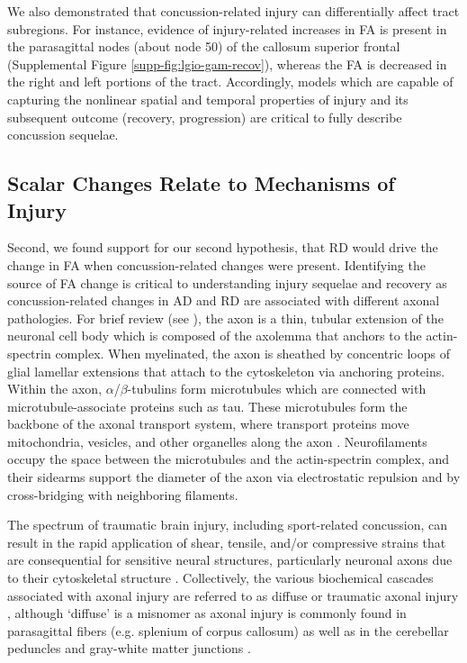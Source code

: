 \documentclass[]{imag-ms-template}
\begin{document}
We also demonstrated that concussion-related injury can differentially affect tract subregions. For instance, evidence of injury-related increases in FA is present in the parasagittal nodes (about node 50) of the callosum superior frontal (Supplemental Figure \ref{supp-fig:lgio-gam-recov}), whereas the FA is decreased in the right and left portions of the tract. Accordingly, models which are capable of capturing the nonlinear spatial and temporal properties of injury and its subsequent outcome (recovery, progression) are critical to fully describe concussion sequelae.

\subsection{Scalar Changes Relate to Mechanisms of Injury}
\label{ssec:disc-tract}
Second, we found support for our second hypothesis, that RD would drive the change in FA when concussion-related changes were present. Identifying the source of FA change is critical to understanding injury sequelae and recovery as concussion-related changes in AD and RD are associated with different axonal pathologies. For brief review (see \textcite{krieg2023IdentifyingPhenotypesDiffuse}), the axon is a thin, tubular extension of the neuronal cell body which is composed of the axolemma that anchors to the actin-spectrin complex. When myelinated, the axon is sheathed by concentric loops of glial lamellar extensions that attach to the cytoskeleton via anchoring proteins. Within the axon, $\alpha$/$\beta$-tubulins form microtubules which are connected with microtubule-associate proteins such as tau. These microtubules form the backbone of the axonal transport system, where transport proteins move mitochondria, vesicles, and other organelles along the axon \parencite{shin2020AxonalTransportDysfunction}. Neurofilaments occupy the space between the microtubules and the actin-spectrin complex, and their sidearms support the diameter of the axon via electrostatic repulsion and by cross-bridging with neighboring filaments.

The spectrum of traumatic brain injury, including sport-related concussion, can result in the rapid application of shear, tensile, and/or compressive strains that are consequential for sensitive neural structures, particularly neuronal axons due to their cytoskeletal structure \parencite{elsayed2008BiomechanicsTraumaticBrain,johnson2013AxonalPathologyTraumatic,bar-kochba2016StrainRatedependentNeuronal}. Collectively, the various biochemical cascades associated with axonal injury are referred to as diffuse or traumatic axonal injury \parencite{krieg2023IdentifyingPhenotypesDiffuse}, although `diffuse' is a misnomer as axonal injury is commonly found in parasagittal fibers (e.g. splenium of corpus callosum) as well as in the cerebellar peduncles and gray-white matter junctions \parencite{jang2020DiagnosticProblemsDiffuse,fork2005NeuropsychologicalSequelaeDiffuse,meythaler2001CurrentConceptsDiffuse,johnson2013AxonalPathologyTraumatic,lindsey2023DiffusionWeightedImagingMild}.
\end{document}
